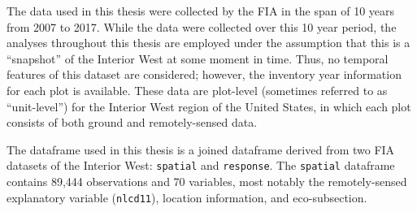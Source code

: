\documentclass[12pt,twoside]{reedthesis}
\begin{document}
The data used in this thesis were collected by the FIA in the span of 10 years from 2007 to 2017. While the data were collected over this 10 year period, the analyses throughout this thesis are employed under the assumption that this is a ``snapshot'' of the Interior West at some moment in time. Thus, no temporal features of this dataset are considered; however, the inventory year information for each plot is available. These data are plot-level (sometimes referred to as ``unit-level'') for the Interior West region of the United States, in which each plot consists of both ground and remotely-sensed data.

The dataframe used in this thesis is a joined dataframe derived from two FIA datasets of the Interior West: \texttt{spatial} and \texttt{response}. The \texttt{spatial} dataframe contains 89,444 observations and 70 variables, most notably the remotely-sensed explanatory variable (\texttt{nlcd11}), location information, and eco-subsection.
\end{document}
